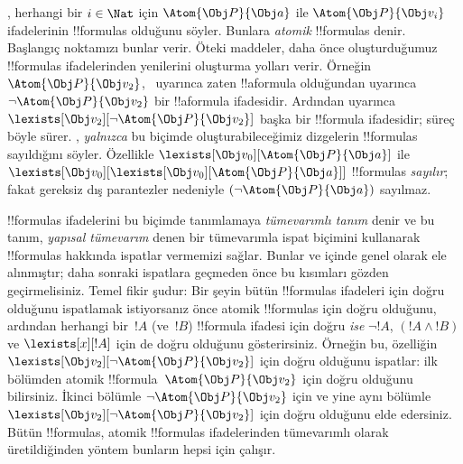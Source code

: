 \documentclass[../../../include/open-logic-section]{subfiles}
\begin{document}
, herhangi bir $i\in\Nat$ için
$\Atom{\Obj P}{\Obj a}$ ile $\Atom{\Obj P}{\Obj v_i}$ ifadelerinin
!!{formula}s olduğunu söyler. Bunlara \emph{atomik} !!{formula}s
denir. Başlangıç noktamızı bunlar verir. Öteki maddeler, daha önce
oluşturduğumuz !!{formula}s ifadelerinden yenilerini oluşturma yolları
verir. Örneğin $\Atom{\Obj P}{\Obj v_2}$,~ uyarınca
zaten !!a{formula} olduğundan  uyarınca
$\lnot\Atom{\Obj P}{\Obj v_2}$ bir !!a{formula} ifadesidir. Ardından
 uyarınca
$\lexists[\Obj v_2][\lnot\Atom{\Obj P}{\Obj v_2}]$ başka bir
!!{formula} ifadesidir; süreç böyle sürer. , \emph{yalnızca}
bu biçimde oluşturabileceğimiz dizgelerin !!{formula}s sayıldığını
söyler. Özellikle $\lexists[\Obj v_0][\Atom{\Obj P}{\Obj a}]$ ile
$\lexists[\Obj v_0][\lexists[\Obj v_0][\Atom{\Obj P}{\Obj a}]]$
!!{formula}s \emph{sayılır}; fakat gereksiz dış parantezler nedeniyle
$(\lnot\Atom{\Obj P}{\Obj a})$ sayılmaz.

!!{formula}s ifadelerini bu biçimde tanımlamaya \emph{tümevarımlı
tanım} denir ve bu tanım, \emph{yapısal tümevarım} denen bir tümevarımla
ispat biçimini kullanarak !!{formula}s hakkında ispatlar vermemizi
sağlar. Bunlar  ve
 içinde genel olarak ele alınmıştır; daha
sonraki ispatlara geçmeden önce bu kısımları gözden geçirmelisiniz.
Temel fikir şudur: Bir şeyin bütün !!{formula}s ifadeleri için doğru
olduğunu ispatlamak istiyorsanız önce atomik !!{formula}s için doğru
olduğunu, ardından herhangi bir~$!A$ (ve~$!B$) !!{formula} ifadesi
için doğru \emph{ise} $\lnot !A$, $(!A\land !B)$ ve
$\lexists[x][!A]$ için de doğru olduğunu gösterirsiniz. Örneğin bu,
özelliğin $\lexists[\Obj v_2][\lnot\Atom{\Obj P}{\Obj v_2}]$ için
doğru olduğunu ispatlar: ilk bölümden atomik
!!{formula}~$\Atom{\Obj P}{\Obj v_2}$ için doğru olduğunu bilirsiniz.
İkinci bölümle $\lnot\Atom{\Obj P}{\Obj v_2}$ için ve yine aynı
bölümle $\lexists[\Obj v_2][\lnot\Atom{\Obj P}{\Obj v_2}]$ için doğru
olduğunu elde edersiniz. Bütün !!{formula}s, atomik !!{formula}s
ifadelerinden tümevarımlı olarak üretildiğinden yöntem bunların hepsi
için çalışır.
\end{document}
